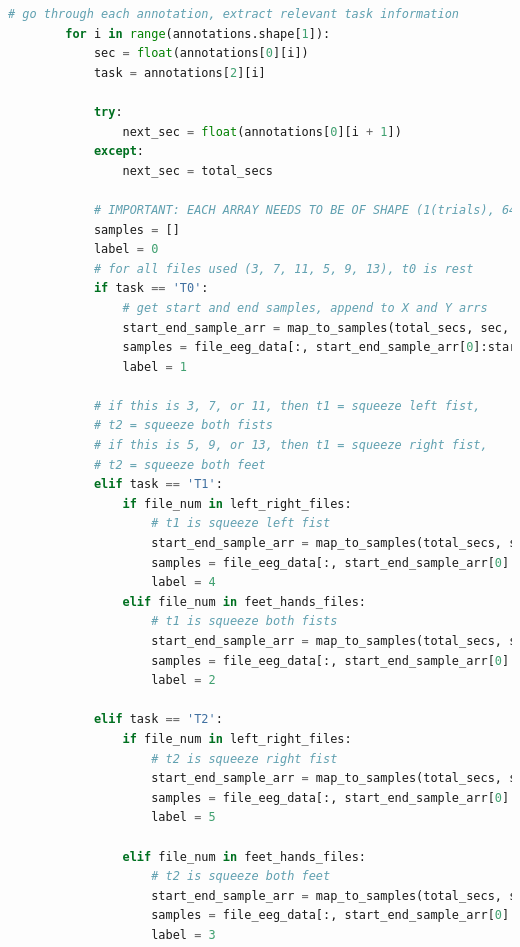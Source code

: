 \documentclass[conference]{IEEEtran}
\begin{document}
\begin{lstlisting}[language=Python, caption=Data Preprocessing Code, label=preprocessing_code]
        # go through each annotation, extract relevant task information
        for i in range(annotations.shape[1]):
            sec = float(annotations[0][i])
            task = annotations[2][i]

            try:
                next_sec = float(annotations[0][i + 1])
            except:
                next_sec = total_secs

            # IMPORTANT: EACH ARRAY NEEDS TO BE OF SHAPE (1(trials), 64(channels), SAMPLES) B4 APPENDING
            samples = []
            label = 0
            # for all files used (3, 7, 11, 5, 9, 13), t0 is rest
            if task == 'T0':
                # get start and end samples, append to X and Y arrs
                start_end_sample_arr = map_to_samples(total_secs, sec, next_sec, total_samples[0])
                samples = file_eeg_data[:, start_end_sample_arr[0]:start_end_sample_arr[1]]
                label = 1

            # if this is 3, 7, or 11, then t1 = squeeze left fist,
            # t2 = squeeze both fists
            # if this is 5, 9, or 13, then t1 = squeeze right fist,
            # t2 = squeeze both feet
            elif task == 'T1':
                if file_num in left_right_files:
                    # t1 is squeeze left fist
                    start_end_sample_arr = map_to_samples(total_secs, sec, next_sec, total_samples[0])
                    samples = file_eeg_data[:, start_end_sample_arr[0]:start_end_sample_arr[1]]
                    label = 4
                elif file_num in feet_hands_files:
                    # t1 is squeeze both fists
                    start_end_sample_arr = map_to_samples(total_secs, sec, next_sec, total_samples[0])
                    samples = file_eeg_data[:, start_end_sample_arr[0]:start_end_sample_arr[1]]
                    label = 2

            elif task == 'T2':
                if file_num in left_right_files:
                    # t2 is squeeze right fist
                    start_end_sample_arr = map_to_samples(total_secs, sec, next_sec, total_samples[0])
                    samples = file_eeg_data[:, start_end_sample_arr[0]:start_end_sample_arr[1]]
                    label = 5

                elif file_num in feet_hands_files:
                    # t2 is squeeze both feet
                    start_end_sample_arr = map_to_samples(total_secs, sec, next_sec, total_samples[0])
                    samples = file_eeg_data[:, start_end_sample_arr[0]:start_end_sample_arr[1]]
                    label = 3


\end{lstlisting}
\end{document}
